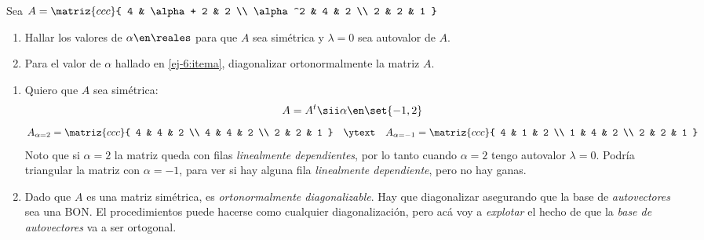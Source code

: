\begin{enunciado}{\ejercicio}
  Sea $A =
    \matriz{ccc}{
      4 & \alpha + 2 & 2 \\
      \alpha^2 & 4 & 2 \\
      2 & 2 & 1
    }$
  \begin{enumerate}[label=(\alph*)]
    \item\label{ej-6:itema} Hallar los valores de $\alpha \en \reales$ para que $A$ sea simétrica y $\lambda = 0$ sea
          autovalor de $A$.

    \item Para el valor de $\alpha$ hallado en \ref{ej-6:itema}, diagonalizar ortonormalmente la matriz $A$.
  \end{enumerate}
\end{enunciado}

\begin{enumerate}[label=(\alph*)]
  \item Quiero que $A$ sea simétrica:
        $$
          A = A^t
          \sii
          \alpha \en \set{-1, 2}
        $$
        $$
          A_{\alpha = 2} =
          \matriz{ccc}{
            4 & 4 & 2 \\
            4 & 4 & 2 \\
            2 & 2 & 1
          }
          \quad
          \ytext
          \quad
          A_{\alpha = -1} =
          \matriz{ccc}{
            4 & 1 & 2 \\
            1 & 4 & 2 \\
            2 & 2 & 1
          }
        $$
        Noto que si $\alpha = 2$ la matriz queda con filas \textit{linealmente dependientes},
        por lo tanto cuando $\alpha = 2$ tengo autovalor $\lambda = 0$. Podría triangular la matriz con
        $\alpha = -1$, para ver si hay alguna fila \textit{linealmente dependiente}, pero no hay ganas.

  \item Dado que $A$ es una matriz simétrica, es \textit{ortonormalmente diagonalizable}. Hay que diagonalizar
        asegurando que la base de \textit{autovectores} sea una BON. El procedimientos puede hacerse como cualquier
        diagonalización, pero acá voy a \textit{explotar } el hecho de que la \textit{base de autovectores}
        va a ser ortogonal.


\end{enumerate}
